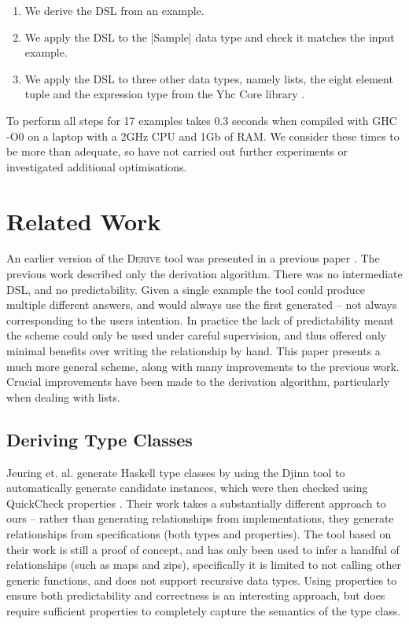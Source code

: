 \documentclass{llncs}
\newcommand{\derive}{\textsc{Derive}}
\begin{document}
\begin{enumerate}
\item We derive the DSL from an example.
\item We apply the DSL to the |Sample| data type and check it matches the input example.
\item We apply the DSL to three other data types, namely lists, the eight element tuple and the expression type from the Yhc Core library \cite{me:yhc_core}.
\end{enumerate}

To perform all steps for 17 examples takes 0.3 seconds when compiled with GHC -O0 on a laptop with a 2GHz CPU and 1Gb of RAM. We consider these times to be more than adequate, so have not carried out further experiments or investigated additional optimisations.

\section{Related Work}
\label{sec:related}

An earlier version of the \derive{} tool was presented in a previous paper \cite{me:yds_derive}. The previous work described only the derivation algorithm. There was no intermediate DSL, and no predictability. Given a single example the tool could produce multiple different answers, and would always use the first generated -- not always corresponding to the users intention. In practice the lack of predictability meant the scheme could only be used under careful supervision, and thus offered only minimal benefits over writing the relationship by hand. This paper presents a much more general scheme, along with many improvements to the previous work. Crucial improvements have been made to the derivation algorithm, particularly when dealing with lists.

\subsection{Deriving Type Classes}

Jeuring et. al. \cite{jeuring:generating_generic_functions} generate Haskell type classes by using the Djinn tool \cite{djinn} to automatically generate candidate instances, which were then checked using QuickCheck properties \cite{quickcheck}. Their work takes a substantially different approach to ours -- rather than generating relationships from implementations, they generate relationships from specifications (both types and properties). The tool based on their work is still a proof of concept, and has only been used to infer a handful of relationships (such as maps and zips), specifically it is limited to not calling other generic functions, and does not support recursive data types. Using properties to ensure both predictability and correctness is an interesting approach, but does require sufficient properties to completely capture the semantics of the type class.
\end{document}
